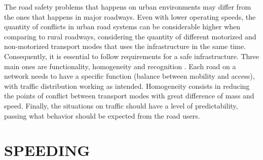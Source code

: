 
The road safety problems that happens on urban environments may differ from the ones that happens in major roadways. Even with lower operating speeds, the quantity of conflicts in urban road systems can be considerable higher when comparing to rural roadways, considering the quantity of different motorized and non-motorized transport modes that uses the infrastructure in the same time. Consequently, it is essential to follow requirements for a safe infrastructure. Three main ones are functionality, homogeneity and recognition \cite{SWOV2003}. Each road on a network needs to have a specific function (balance between mobility and access), with traffic distribution working as intended. Homogeneity consists in reducing the points of conflict between transport modes with great difference of mass and speed. Finally, the situations on traffic should have a level of predictability, passing what behavior should be expected from the road users.




\section{SPEEDING}








